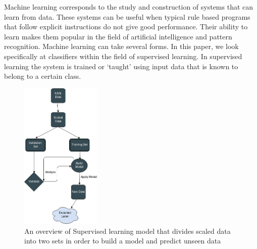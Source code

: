 Machine learning corresponds to the study and construction of systems that can learn from data. These systems can be useful when typical rule based programs that follow explicit instructions do not give good performance. Their ability to learn makes them popular in the field of artificial intelligence and pattern recognition. Machine learning can take several forms. In this paper, we look specifically at classifiers within the field of supervised learning. In supervised learning the system is trained or `taught' using input data that is known to belong to a certain class.\\ 

\begin{figure}[H]
\centering
    \includegraphics[width=38mm,scale=0.1]{./img/SL.png}
    \caption{\footnotesize{An overview of Supervised learning model that divides scaled data into two sets in order to build a model and predict unseen data }}
    \label{fig:SL}
\end{figure}

